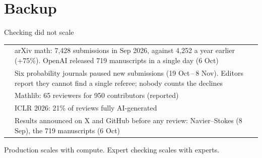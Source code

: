 \section{Backup}

\begin{frame}{Checking did not scale}
  \footnotesize\sffamily
  \renewcommand{\arraystretch}{1.45}
  \begin{tabularx}{\linewidth}{@{}p{2.6cm}Y@{}}
    \toprule
     & \\
    \midrule
     & arXiv math: 7,428 submissions in Sep 2026, against 4,252 a year earlier (+75\%).
      OpenAI released 719 manuscripts in a single day (6 Oct)\\
     & Six probability journals paused new submissions (19 Oct\,--\,8 Nov).
      Editors report they cannot find a single referee; nobody counts the declines\\
     & Mathlib: 65 reviewers for 950 contributors (reported)\\
     & ICLR 2026: 21\% of reviews fully AI-generated\\
     & Results announced on X and GitHub before any review:
      Navier--Stokes (8 Sep), the 719 manuscripts (6 Oct)\\
    \bottomrule
  \end{tabularx}\par\medskip
  {\color{black!60}\scriptsize Production scales with compute. Expert checking scales with experts.}
\end{frame}

